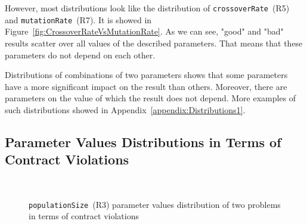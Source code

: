 However, most distributions look like the distribution of \texttt{crossoverRate}~(R5) and \texttt{mutationRate}~(R7). It is showed in Figure~\ref{fig:CrossoverRateVsMutationRate}. As we can see, "good" and "bad" results scatter over all values of the described parameters. That means that these parameters do not depend on each other.

Distributions of combinations of two parameters shows that some parameters have a more significant impact on the result than others. Moreover, there are parameters on the value of which the result does not depend. More examples of such distributions showed in Appendix~\ref{appendix:Distributions1}.

\subsection{Parameter Values Distributions in Terms of Contract Violations}

\begin{figure}
	\\
	
	\caption[\texttt{populationSize}~(R3) parameter values distribution of two problems in terms of contract violations]{\texttt{populationSize}~(R3) parameter values distribution of two problems in terms of contract violations}
	\label{fig:populationSize_gradient}
\end{figure}




